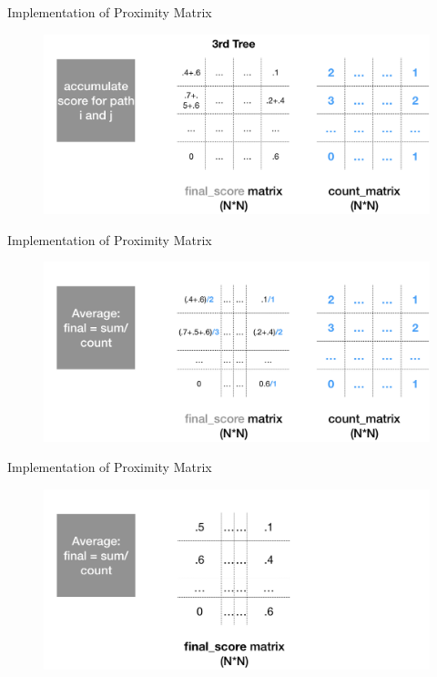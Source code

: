\documentclass[shortpres]{beamer}
\begin{document}
    \begin{frame}{Implementation of Proximity Matrix}	
      \begin{figure}
        \includegraphics[height=0.6\textheight]{fig/proximity03.png}
      \end{figure}
    \end{frame}
    \begin{frame}{Implementation of Proximity Matrix}	
      \begin{figure}
        \includegraphics[height=0.6\textheight]{fig/proximity04.png}
      \end{figure}
    \end{frame}
    \begin{frame}{Implementation of Proximity Matrix}	
      \begin{figure}
        \includegraphics[height=0.6\textheight]{fig/proximity05.png}
      \end{figure}
    \end{frame}
\end{document}
